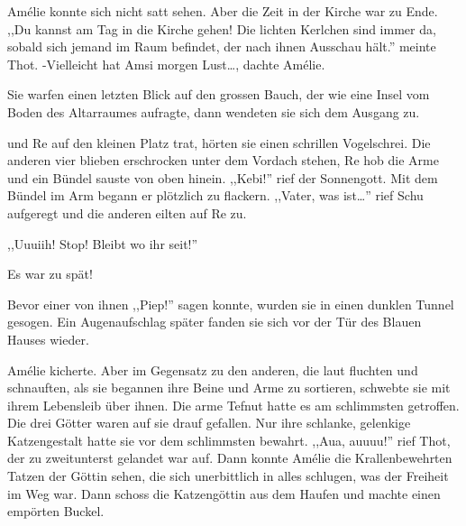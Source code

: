 \documentclass[11pt,titlepage,a5paper]{book}
\begin{document}
Amélie konnte sich nicht satt sehen. Aber die Zeit in der Kirche war zu Ende. ,,Du kannst am Tag in die Kirche gehen! Die lichten Kerlchen sind immer da, sobald sich jemand im Raum befindet, der nach ihnen Ausschau hält.'' meinte Thot. -Vielleicht hat Amsi morgen Lust\dots, dachte Amélie.

Sie warfen einen letzten Blick auf den grossen Bauch, der wie eine Insel vom Boden des Altarraumes aufragte, dann wendeten sie sich dem Ausgang zu.

und Re auf den kleinen Platz trat, hörten sie einen schrillen Vogelschrei. Die anderen vier blieben erschrocken unter dem Vordach stehen, Re hob die Arme und ein Bündel sauste von oben hinein. ,,Kebi!'' rief der Sonnengott. Mit dem Bündel im Arm begann er plötzlich zu flackern. ,,Vater, was ist\dots'' rief Schu aufgeregt und die anderen eilten auf Re zu.
\begin{Large},,Uuuiih! Stop! Bleibt wo ihr seit!''\end{Large} Es war zu spät!

Bevor einer von ihnen ,,Piep!'' sagen konnte, wurden sie in einen dunklen Tunnel gesogen. Ein Augenaufschlag später fanden sie sich vor der Tür des Blauen Hauses wieder.

Amélie kicherte. Aber im Gegensatz zu den anderen, die laut fluchten und schnauften,  als sie begannen ihre Beine und Arme zu sortieren, schwebte sie mit ihrem Lebensleib über ihnen. Die arme Tefnut hatte es am schlimmsten getroffen. Die drei Götter waren auf sie drauf gefallen. Nur ihre schlanke, gelenkige Katzengestalt hatte sie vor dem schlimmsten bewahrt. ,,Aua, auuuu!'' rief Thot, der zu zweitunterst gelandet war auf. Dann konnte Amélie die Krallenbewehrten Tatzen der Göttin sehen, die sich unerbittlich in alles schlugen, was der Freiheit im Weg war. Dann schoss die Katzengöttin aus dem Haufen und machte einen empörten Buckel.

\tableofcontents


{}

\end{document}
